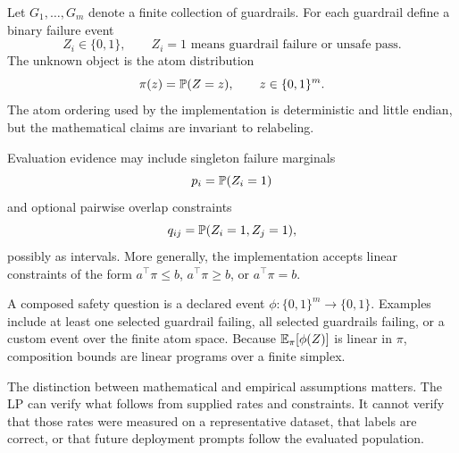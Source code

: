 Let $G_1,\ldots,G_m$ denote a finite collection of guardrails. For each
guardrail define a binary failure event
\[
  Z_i \in \{0,1\}, \qquad Z_i = 1 \text{ means guardrail failure or unsafe pass.}
\]
The unknown object is the atom distribution
\[
  \pi(z) = \mathbb{P}(Z=z), \qquad z \in \{0,1\}^m.
\]
The atom ordering used by the implementation is deterministic and little
endian, but the mathematical claims are invariant to relabeling.

Evaluation evidence may include singleton failure marginals
\[
  p_i = \mathbb{P}(Z_i=1)
\]
and optional pairwise overlap constraints
\[
  q_{ij} = \mathbb{P}(Z_i=1, Z_j=1),
\]
possibly as intervals. More generally, the implementation accepts linear
constraints of the form $a^\top \pi \le b$, $a^\top \pi \ge b$, or
$a^\top \pi=b$.

A composed safety question is a declared event $\phi:\{0,1\}^m\to\{0,1\}$.
Examples include at least one selected guardrail failing, all selected
guardrails failing, or a custom event over the finite atom space. Because
$\mathbb{E}_\pi[\phi(Z)]$ is linear in $\pi$, composition bounds are linear programs
over a finite simplex.

The distinction between mathematical and empirical assumptions matters. The LP
can verify what follows from supplied rates and constraints. It cannot verify
that those rates were measured on a representative dataset, that labels are
correct, or that future deployment prompts follow the evaluated population.
